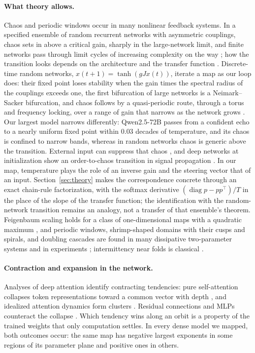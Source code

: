 \documentclass[11pt,letterpaper]{article}
\begin{document}
\paragraph{What theory allows.} Chaos and periodic windows occur in many nonlinear feedback
systems. In a specified ensemble of random recurrent networks with asymmetric couplings, chaos sets in above a
critical gain, sharply in the large-network limit, and finite networks pass through limit cycles of increasing
complexity on the way \cite{sompolinsky1988chaos}; how the transition looks depends on the architecture and the
transfer function \cite{kadmon2015transition}. Discrete-time random networks, $x(t+1)=\tanh(gJx(t))$, iterate a map
as our loop does: their fixed point loses stability when the gain times the spectral radius of the couplings exceeds
one, the first bifurcation of large networks is a Neimark--Sacker bifurcation, and chaos follows by a quasi-periodic
route, through a torus and frequency locking, over a range of gain that narrows as the network grows
\cite{doyon1994bifurcations}. Our largest model narrows differently: Qwen2.5-72B passes from a confident echo to a
nearly uniform fixed point within 0.03 decades of temperature, and its chaos is confined to narrow bands, whereas in
random networks chaos is generic above the transition. External input can suppress that chaos
\cite{rajan2010stimulus}, and deep networks at initialization show an order-to-chaos transition in signal propagation
\cite{poole2016exponential,schoenholz2017deep}. In our map, temperature plays the role of an inverse gain and the
steering vector that of an input. Section~\ref{sec:theory} makes the correspondence concrete through an exact
chain-rule factorization, with the softmax derivative $(\operatorname{diag}p-pp^{\top})/T$ in the place of the slope
of the transfer function; the identification with the random-network transition remains an analogy, not a transfer
of that ensemble's theorem. Feigenbaum scaling holds for a class of one-dimensional maps with a quadratic maximum
\cite{feigenbaum1978quantitative}, and periodic windows, shrimp-shaped domains with their cusps and spirals, and
doubling cascades are found in many dissipative two-parameter systems
\cite{gallas1993structure,bonatto2008periodicity,vitolo2011hubs,facanha2013endoskeletons} and in experiments
\cite{stoop2010real}; intermittency near folds is classical \cite{pomeau1980intermittent}.

\paragraph{Contraction and expansion in the network.} Analyses of deep attention identify contracting tendencies:
pure self-attention collapses token representations toward a common vector with depth \cite{dong2021attention}, and
idealized attention dynamics form clusters \cite{geshkovski2023emergence}. Residual connections and MLPs counteract
the collapse \cite{dong2021attention}. Which tendency wins along an orbit is a property of the trained weights that
only computation settles. In every dense model we mapped, both outcomes occur: the same map has negative largest
exponents in some regions of its parameter plane and positive ones in others.
\end{document}
